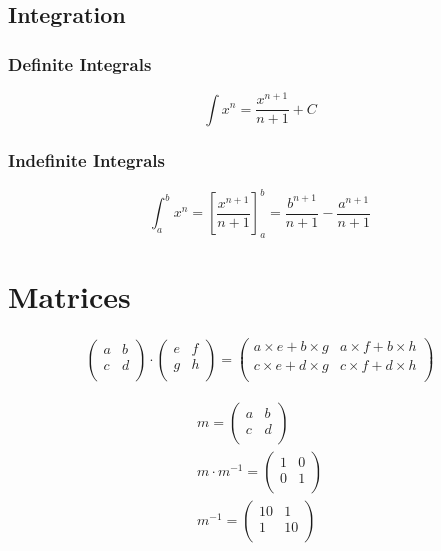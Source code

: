 \documentclass{article}
\begin{document}
\subsection{Integration}

\subsubsection{Definite Integrals}

\begin{equation}
	\int x^n = \frac{x^{n + 1}}{n+1} + C
\end{equation}

\subsubsection{Indefinite Integrals}

\begin{equation}
	\int_a^b x^n = \left [ \frac{x^{n+1}}{n+1}\right ]_a^b= \frac{b^{n + 1}}{n+1} - \frac{a^{n+1}}{n+1}
\end{equation}

\section{Matrices}

\begin{gather*}
	\begin{pmatrix}
		a & b \\
		c & d \\
	\end{pmatrix} \cdot \begin{pmatrix}
		e & f \\
		g & h \\
	\end{pmatrix} = \begin{pmatrix}
		a \times e + b \times g & a \times f + b \times h \\
		c \times e + d \times g & c \times f + d \times h \\
	\end{pmatrix}
\end{gather*}

\begin{gather*}
	m = \begin{pmatrix}
		a & b \\
		c & d \\
	\end{pmatrix}\\
	m \cdot m^{-1} = \begin{pmatrix}
		1 & 0 \\
		0 & 1 \\
	\end{pmatrix}\\
	m^{-1} = \begin{pmatrix}
		10 & 1 \\
		1 & 10 \\
	\end{pmatrix}
\end{gather*}
\end{document}
